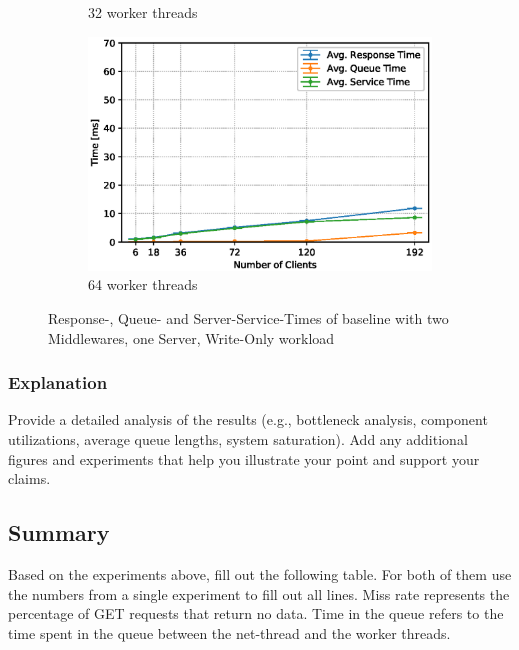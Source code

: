 \documentclass[11pt,a4paper]{article}
\begin{document}
\begin{figure}
\begin{subfigure}{.5\textwidth}
        \caption{32 worker threads}
    \end{subfigure}
    \begin{subfigure}{.5\textwidth}
        \includegraphics[width=1\linewidth]{plots/3_2b_extendedLatencyMiddleware_64w.eps}
        \caption{64 worker threads}
    \end{subfigure}

    \caption{Response-, Queue- and Server-Service-Times of baseline with two Middlewares, one Server, Write-Only workload}
    \label{fig:3-2-times-writeonly}
\end{figure}

\subsubsection{Explanation}

Provide a detailed analysis of the results (e.g., bottleneck analysis, component utilizations, average queue lengths, system saturation). Add any additional figures and experiments that help you illustrate your point and support your claims.

\subsection{Summary}

Based on the experiments above, fill out the following table. For both of them use the numbers from a single experiment to fill out all lines. Miss rate represents the percentage of GET requests that return no data. Time in the queue refers to the time spent in the queue between the net-thread and the worker threads.
\end{document}
